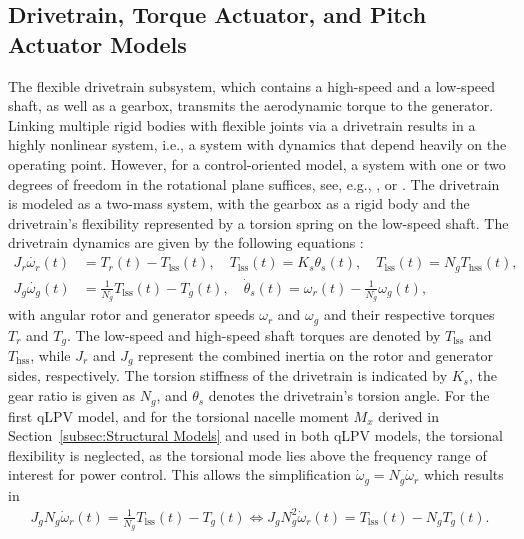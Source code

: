 \subsection{Drivetrain, Torque Actuator, and Pitch Actuator Models}\label{subsec:drivetrain, Torque Actuator, and Pitch Actuator Models}
The flexible drivetrain subsystem, which contains a high-speed and a low-speed shaft, as well as a gearbox, transmits the aerodynamic torque to the generator. Linking multiple rigid bodies with flexible joints via a drivetrain results in a highly nonlinear system, i.e., a system with dynamics that depend heavily on the operating point. However, for a control-oriented model, a system with one or two degrees of freedom in the rotational plane suffices, see, e.g., \cite{Bianchi2007}, \cite{peeters2006analysis} or  \cite{sharan2018actuator}.  
%
The drivetrain is modeled as a two-mass system, with the gearbox as a rigid body and the drivetrain's flexibility represented by a torsion spring on the low-speed shaft. The drivetrain dynamics are given by the following equations \cite{sharan2018actuator}:
\begin{align} 
    J_{r}\dot{\omega_{r}}(t) &= T_{r}(t) - T_{\text{lss}}(t), \quad T_{\text{lss}}(t) = K_{s}\theta_{s}(t), \quad T_{\text{lss}}(t) = N_{g}T_{\text{hss}}(t), \nonumber\\
    J_{g}\dot{\omega_{g}}(t) &= \frac{1}{N_{g}} T_{\text{lss}}(t) - T_{g}(t), \quad \dot{\theta}_{s}(t) = \omega_{r}(t) - \frac{1}{N_{g}} \omega_{g}(t), \label{eq:DrvTr}
\end{align}
with angular rotor and generator speeds $\omega_{r}$ and $\omega_{g}$ and their respective torques $T_{r}$ and $T_{g}$. The low-speed and high-speed shaft torques are denoted by $T_{\text{lss}}$ and $T_{\text{hss}}$, while $J_{r}$ and $J_{g}$ represent the combined inertia on the rotor and generator sides, respectively. The torsion stiffness of the drivetrain is indicated by $K_{s}$, the gear ratio is given as $N_{g}$, and $\theta_{s}$ denotes the drivetrain's torsion angle. For the first qLPV model, and for the torsional nacelle moment $M_x$ derived in Section~\ref{subsec:Structural Models} and used in both qLPV  models, the torsional flexibility is neglected, as the torsional mode lies above the frequency range of interest for power control. This allows the simplification $\dot{\omega}_g = N_g \dot{\omega}_r$ which results in
\begin{align} \label{eq:DrivetrainStiff}
    J_{g}N_g \dot{\omega}_r(t) = \frac{1}{N_{g}} T_{\text{lss}}(t) - T_{g}(t) \iff J_{g}N^2_g \dot{\omega}_r(t) = T_{\text{lss}}(t) - N_gT_{g}(t).
\end{align}

